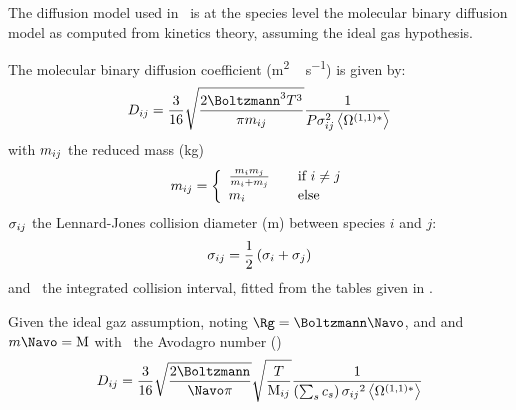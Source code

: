 The diffusion model used in \Antioch\ is at the species
level the molecular binary diffusion model as computed from kinetics
theory, assuming the ideal gas hypothesis.

The molecular binary diffusion coefficient (\unit{m^2\,s^{-1}}) is given by:
\begin{equation}
\diff[ij] = \frac{3}{16} \sqrt{\frac{2\Boltzmann^3\Temp^3}{\pi\Mass_{ij}}}\frac{1}{\Press\LJdia_{ij}^2\Stockmayer{1}}
\label{bimol_diff:eq}
\end{equation}
with $\Mass_{ij}$ the reduced mass (\unit{kg})
\begin{equation}
\Mass_{ij} = \left\{\begin{array}{l@{\qquad}l}
                \frac{\Mass_i\Mass_j}{\Mass_i + \Mass_j} & \text{if } i \neq j \\
                \Mass_i                                  & \text{else}
                    \end{array}
              \right.
\label{diffusion:bimol:red_mass}
\end{equation}
$\LJdia_{ij}$ the Lennard-Jones collision diameter (\unit{m})
between species $i$ and $j$:
\begin{equation}
\LJdia_{ij} = \frac{1}{2}\left(\LJdia_i + \LJdia_j\right)
\label{diffusion:bimol:LJdia}
\end{equation}
and \ the integrated collision interval, fitted from
the tables given in \citet{Monchick1961}.

Given the ideal gaz assumption, noting $\Rg = \Boltzmann\Navo$, and
and $\Mass\Navo = \Mm$ with
\Navo\ the Avodagro number (\NavoEquation)
\begin{equation}
\diff[ij] = \frac{3}{16}\sqrt{\frac{2\Boltzmann}{\Navo\pi}} 
                \sqrt{\frac{\Temp}{\Mm[ij]}}\frac{1}{\left(\sum_s\conc_s\right)\LJdia[ij]^2\Stockmayer{1}}
\label{diffusion:bimol:simplified}
\end{equation}
